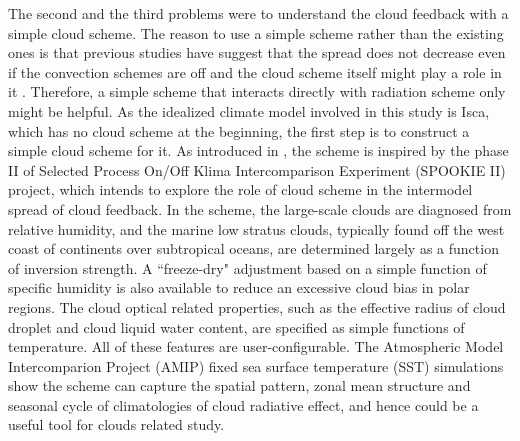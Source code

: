 The second and the third problems were to understand the cloud feedback with a simple cloud scheme. The reason to use a simple scheme rather than the existing ones is that previous studies have suggest that the spread does not decrease even if the convection schemes are off \citep{Webb2015} and the cloud scheme itself might play a role in it \citep[e.g.,][]{Qu2014,Geoffroy2017}. Therefore, a simple scheme that interacts directly with radiation scheme only might be helpful. As the idealized climate model involved in this study is Isca, which has no cloud scheme at the beginning, the first step is to construct a simple cloud scheme for it. As introduced in , the scheme \citep{Liu2021simcloud} is inspired by the phase II of Selected Process On/Off Klima Intercomparison Experiment (SPOOKIE II) project, which intends to explore the role of cloud scheme in the intermodel spread of cloud feedback. In the scheme, the large-scale clouds are diagnosed from relative humidity, and the marine low stratus clouds, typically found off the west coast of continents over subtropical oceans, are determined largely as a function of inversion strength. A ``freeze-dry" adjustment based on a simple function of specific humidity is also available to reduce an excessive cloud bias in polar regions. The cloud optical related properties, such as the effective radius of cloud droplet and cloud liquid water content, are specified as simple functions of temperature. All of these features are user-configurable. The Atmospheric Model Intercomparion Project (AMIP) fixed sea surface temperature (SST) simulations show the scheme can capture the spatial pattern, zonal mean structure and seasonal cycle of climatologies of cloud radiative effect, and hence could be a useful tool for clouds related study. 

